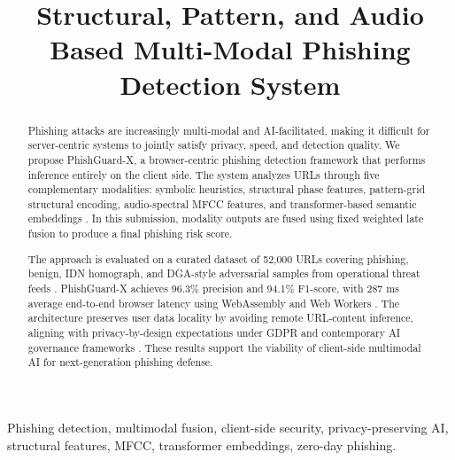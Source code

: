 \documentclass[conference]{IEEEtran}
\begin{document}
\title{Structural, Pattern, and Audio Based Multi-Modal Phishing Detection System}

\author{
\and
{}
}

\maketitle

\begin{abstract}
Phishing attacks are increasingly multi-modal and AI-facilitated, making it difficult for server-centric systems to jointly satisfy privacy, speed, and detection quality. We propose PhishGuard-X, a browser-centric phishing detection framework that performs inference entirely on the client side. The system analyzes URLs through five complementary modalities: symbolic heuristics, structural phase features, pattern-grid structural encoding, audio-spectral MFCC features, and transformer-based semantic embeddings \cite{b1,b14,b16}. In this submission, modality outputs are fused using fixed weighted late fusion to produce a final phishing risk score.

The approach is evaluated on a curated dataset of 52,000 URLs covering phishing, benign, IDN homograph, and DGA-style adversarial samples from operational threat feeds \cite{b46,b47,b48,b49}. PhishGuard-X achieves 96.3\% precision and 94.1\% F1-score, with 287 ms average end-to-end browser latency using WebAssembly and Web Workers \cite{b39,b41}. The architecture preserves user data locality by avoiding remote URL-content inference, aligning with privacy-by-design expectations under GDPR and contemporary AI governance frameworks \cite{b7,b26,b32,b45}. These results support the viability of client-side multimodal AI for next-generation phishing defense.
\end{abstract}

\begin{IEEEkeywords}
Phishing detection, multimodal fusion, client-side security, privacy-preserving AI, structural features, MFCC, transformer embeddings, zero-day phishing.
\end{IEEEkeywords}
\end{document}
